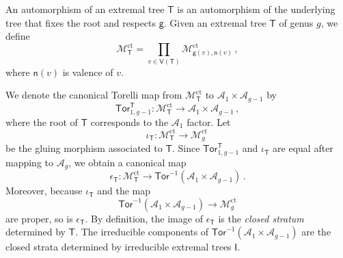 \documentclass[11pt]{amsart}
\theoremstyle{definition}
\newcommand{\M}{\mathcal{M}}
\newcommand{\A}{\mathcal{A}}
\DeclareMathOperator{\ct}{ct}
\newcommand{\Tor}{\mathsf{Tor}}
\begin{document}
{ An automorphism of an extremal tree $\mathsf{T}$ is an automorphism of the underlying tree that 
 fixes the root and respects $\mathsf{g}$.
Given an extremal tree $\mathsf{T}$ of genus $g$, we define
\[
\M^{\ct}_\mathsf{T}=\prod_{v\in \mathsf{V}(\mathsf{T})} \M^{\ct}_{\mathsf{g}(v),\mathsf{n}(v)}\,,
\]
where $\mathsf{n}(v)$ is valence of $v$.




We denote the canonical Torelli map from $\M^{\ct}_\mathsf{T}$ to $\mathcal{A}_1 \times \mathcal{A}_{g-1}$ by
$$\mathsf{Tor}^{\mathsf{T}}_{1,g-1}: \M^{\ct}_\mathsf{T} \rightarrow \mathcal{A}_1 \times \mathcal{A}_{g-1}\, ,$$
where the root of $\mathsf{T}$ corresponds to the $\mathcal{A}_1$ factor. Let
\[
\iota_{\mathsf{T}}: \M^{\ct}_\mathsf{T}\rightarrow \M^{\ct}_{g}\,
\]
be the gluing morphism associated to $\mathsf{T}$.
Since $\mathsf{Tor}^{\mathsf{T}}_{1,g-1}$ and $\iota_\mathsf{T}$ are equal after mapping to $\mathcal{A}_g$, we obtain
a canonical map
$$\epsilon_{\mathsf{T}}: \M^{\ct}_\mathsf{T}\rightarrow  \Tor^{-1}(\A_1\times \A_{g-1})\, .$$
Moreover, because $\iota_{\mathsf T}$ and the map
\[
\Tor^{-1}(\A_1\times \A_{g-1})\rightarrow \M_{g}^{\ct}
\]
are proper, so is $\epsilon_{\mathsf{T}}$.
By definition, the image of $\epsilon_{\mathsf{T}}$ is the {\em closed stratum} determined by $\mathsf{T}$. The irreducible components of $\Tor^{-1}(\A_1\times \A_{g-1})$ are the closed strata determined by irreducible extremal trees $\mathsf{I}$.
 

}
\end{document}
